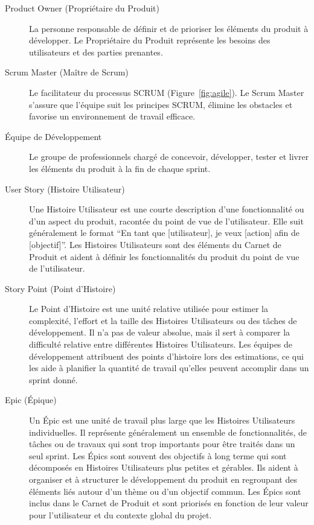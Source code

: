 \begin{description}
    \item[Product Owner (Propriétaire du Produit)] La personne responsable de définir et de prioriser les éléments du produit à développer. Le Propriétaire du Produit représente les besoins des utilisateurs et des parties prenantes.
    \item[Scrum Master (Maître de Scrum)] Le facilitateur du processus SCRUM (Figure~\ref{fig:agile}). Le Scrum Master s'assure que l'équipe suit les principes SCRUM, élimine les obstacles et favorise un environnement de travail efficace.
    \item[Équipe de Développement] Le groupe de professionnels chargé de concevoir, développer, tester et livrer les éléments du produit à la fin de chaque sprint.
    \item[User Story (Histoire Utilisateur)] Une Histoire Utilisateur est une courte description d'une fonctionnalité ou d'un aspect du produit, racontée du point de vue de l'utilisateur. Elle suit généralement le format ``En tant que [utilisateur], je veux [action] afin de [objectif]''. Les Histoires Utilisateurs sont des éléments du Carnet de Produit et aident à définir les fonctionnalités du produit du point de vue de l'utilisateur.
    \item[Story Point (Point d'Histoire)] Le Point d'Histoire est une unité relative utilisée pour estimer la complexité, l'effort et la taille des Histoires Utilisateurs ou des tâches de développement. Il n'a pas de valeur absolue, mais il sert à comparer la difficulté relative entre différentes Histoires Utilisateurs. Les équipes de développement attribuent des points d'histoire lors des estimations, ce qui les aide à planifier la quantité de travail qu'elles peuvent accomplir dans un sprint donné.
    \item[Epic (Épique)] Un Épic est une unité de travail plus large que les Histoires Utilisateurs individuelles. Il représente généralement un ensemble de fonctionnalités, de tâches ou de travaux qui sont trop importants pour être traités dans un seul sprint. Les Épics sont souvent des objectifs à long terme qui sont décomposés en Histoires Utilisateurs plus petites et gérables. Ils aident à organiser et à structurer le développement du produit en regroupant des éléments liés autour d'un thème ou d'un objectif commun. Les Épics sont inclus dans le Carnet de Produit et sont priorisés en fonction de leur valeur pour l'utilisateur et du contexte global du projet.
\end{description}

